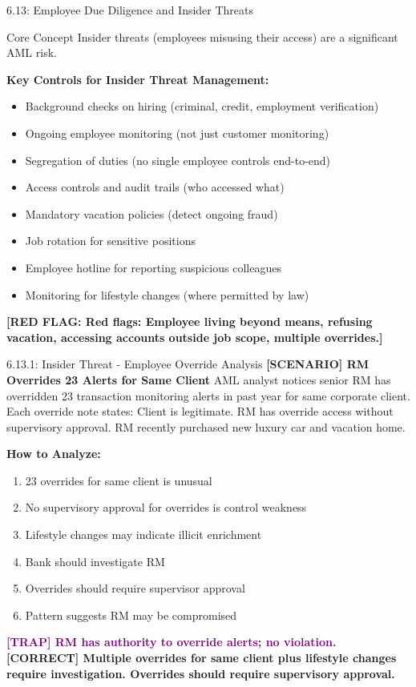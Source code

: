 \documentclass[11pt,a4paper]{beamer}
\newcommand{\trap}[1]{\textcolor{purple}{\textbf{[TRAP] #1}}}
\newcommand{\correct}[1]{\textcolor{green!50!black}{\textbf{[CORRECT] #1}}}
\newcommand{\scenario}[1]{\textcolor{blue!70!black}{\textbf{[SCENARIO] #1}}}
\newcommand{\redflag}[1]{\textcolor{red!80!black}{\textbf{[RED FLAG: #1]}}}
\begin{document}
\begin{frame}{6.13: Employee Due Diligence and Insider Threats}
	\begin{block}{Core Concept}
		Insider threats (employees misusing their access) are a significant AML risk.
	\end{block}
	\textbf{Key Controls for Insider Threat Management:}
	\begin{itemize}
		\item Background checks on hiring (criminal, credit, employment verification)
		\item Ongoing employee monitoring (not just customer monitoring)
		\item Segregation of duties (no single employee controls end-to-end)
		\item Access controls and audit trails (who accessed what)
		\item Mandatory vacation policies (detect ongoing fraud)
		\item Job rotation for sensitive positions
		\item Employee hotline for reporting suspicious colleagues
		\item Monitoring for lifestyle changes (where permitted by law)
	\end{itemize}
	\redflag{Red flags: Employee living beyond means, refusing vacation, accessing accounts outside job scope, multiple overrides.}
\end{frame}

\begin{frame}{6.13.1: Insider Threat - Employee Override Analysis}
	\scenario{RM Overrides 23 Alerts for Same Client}
	AML analyst notices senior RM has overridden 23 transaction monitoring alerts in past year for same corporate client. Each override note states: Client is legitimate. RM has override access without supervisory approval. RM recently purchased new luxury car and vacation home.
	
	\vspace{0.1cm}
	\textbf{How to Analyze:}
	\begin{enumerate}
		\item 23 overrides for same client is unusual
		\item No supervisory approval for overrides is control weakness
		\item Lifestyle changes may indicate illicit enrichment
		\item Bank should investigate RM
		\item Overrides should require supervisor approval
		\item Pattern suggests RM may be compromised
	\end{enumerate}
	\trap{RM has authority to override alerts; no violation.}
	\correct{Multiple overrides for same client plus lifestyle changes require investigation. Overrides should require supervisory approval.}
\end{frame}
\end{document}
